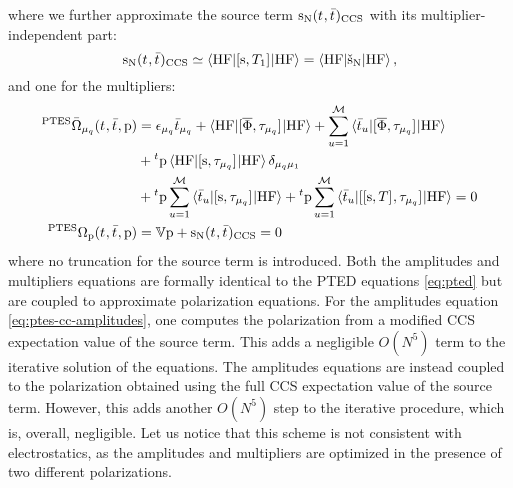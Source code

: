 where we further approximate the source term
$\mathrm{s}_{\mathrm{N}}(t_{},\bar{t}_{})_\mathrm{CCS}$ with its
multiplier-independent part:
\begin{equation}
  \mathrm{s}_{\mathrm{N}}(t_{}, \bar{t}_{})_\mathrm{CCS}
  \simeq
  \braket{\mathrm{HF} | [ \mathrm{s}, T_1 ]^{} | \mathrm{HF}}
  =
  \braket{\mathrm{HF} | \check{\mathrm{s}}_{\mathrm{N}} | \mathrm{HF}},
\end{equation}
and one for the multipliers:
\begin{subequations}\label{eq:ptes-mult}
  \begin{align}
   {}^{\mathrm{PTES}}\bar{\Omega}_{\mu_q}(t_{}, \bar{t}_{}, \mathrm{p})
    &=
    \epsilon_{\mu_q}\bar{t}_{\mu_q} +
    \braket{\mathrm{HF} | [ \overline{\Phi}, \tau_{\mu_q} ]^{} | \mathrm{HF}} +
    \sum_{u=1}^{\mathcal{M}}\braket{\bar{t}_{u} |
    [ \overline{\Phi}, \tau_{\mu_q} ]^{} | \mathrm{HF}}
    \nonumber \\
    &+
    {}^t\mathrm{p}\braket{\mathrm{HF} | [ \mathrm{s}, \tau_{\mu_q} ]^{} |
    \mathrm{HF}}\delta_{\mu_q\mu_1} \nonumber \\
    &+
    {}^t\mathrm{p}\sum_{u=1}^{\mathcal{M}}\braket{\bar{t}_{u} |
    [ \mathrm{s}, \tau_{\mu_q} ]^{} | \mathrm{HF}}
    +
    {}^t\mathrm{p}\sum_{u=1}^{\mathcal{M}}\braket{\bar{t}_{u} |
    [ [ \mathrm{s}, T ]^{}, \tau_{\mu_q} ]^{} | \mathrm{HF}}
             = 0 \label{eq:ptes-cc-multipliers}\\
    {}^{\mathrm{PTES}}\Omega_{\mathrm{p}}(t_{}, \bar{t}_{}, \mathrm{p})
    &=
    \mathbb{V}\mathrm{p} + \mathrm{s}_{\mathrm{N}}(t_{}, \bar{t}_{})_\mathrm{CCS} = 0
    \label{eq:ptes-cc-polarization-mult}
  \end{align}
\end{subequations}
where no truncation for the source term is introduced.
Both the amplitudes and multipliers equations are formally identical to
the \acrshort*{PTED} equations \eqref{eq:pted} but are coupled to
approximate polarization equations.
For the amplitudes equation \eqref{eq:ptes-cc-amplitudes}, one computes
the polarization from a modified \acrshort*{CCS} expectation value of
the source term. This adds a negligible $O(N^5)$ term to the iterative
solution of the equations.
The amplitudes equations are instead coupled to the polarization
obtained using the full \acrshort*{CCS} expectation value of the source
term. However, this adds another $O(N^5)$ step to the iterative
procedure, which is, overall, negligible.
Let us notice that this scheme is not consistent with electrostatics, as
the amplitudes and multipliers are optimized in the presence of two
different polarizations.


